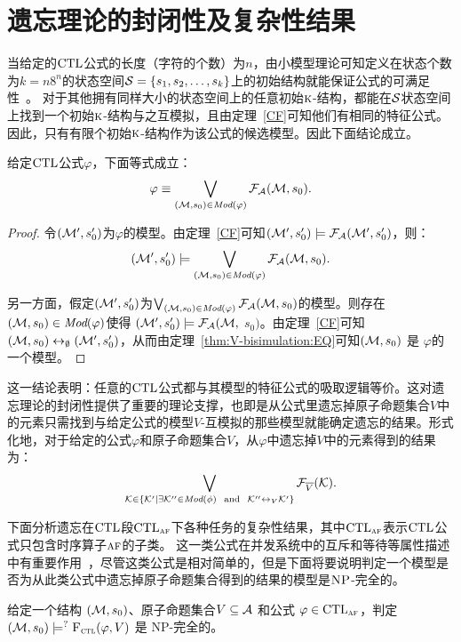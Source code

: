 \section{遗忘理论的封闭性及复杂性结果}\label{chapter06:sec:close}
当给定的$\textrm{CTL}$公式的长度（字符的个数）为$n$，由小模型理论可知定义在状态个数为$k=n8^n$的状态空间${\cal S}=\{s_1,s_2,\dots, s_k\}$上的初始结构就能保证公式的可满足性~\cite{DBLP:journals/jcss/EmersonH85}。
对于其他拥有同样大小的状态空间上的任意初始$\textsc{k}$-结构，都能在${\cal S}$状态空间上找到一个初始$\textsc{k}$-结构与之互模拟，且由定理~\ref{CF}可知他们有相同的特征公式。
因此，只有有限个初始$\textsc{k}$-结构作为该公式的候选模型。因此下面结论成立。

\begin{lemma}\label{lem:models:formula}
	给定$\textrm{CTL}$公式$\varphi$，下面等式成立：
	\begin{equation*}
		\varphi\equiv \bigvee_{({\cal M}, s_0)\in\textit{Mod}(\varphi)}{\cal F}_{\cal A}({\cal M}, s_0).
	\end{equation*}
\end{lemma}
\begin{proof}
	令$({\cal M}', s_0')$为$\varphi$的模型。由定理~\ref{CF}可知$({\cal M}', s_0') \models {\cal F}_{{\cal A}}({\cal M}', s_0')$，则：
	$$({\cal M}', s_0') \models \bigvee_{({\cal M}, s_0)\in \textit{Mod}(\varphi)} {\cal F}_{{\cal A}}({\cal M}, s_0).$$
	
	另一方面，假定$({\cal M}', s_0')$为$\bigvee_{({\cal M}, s_0)\in \textit{Mod}(\varphi)} {\cal F}_{{\cal A}}({\cal M}, s_0)$的模型。则存在$({\cal M}, s_0)\in \textit{Mod}(\varphi)$使得 $({\cal M}', s_0') \models {\cal F}_{{\cal A}}({\cal M},$ $s_0)$。由定理~\ref{CF}可知$({\cal M}, s_0) \leftrightarrow_{\emptyset} ({\cal M}', s_0')$，从而由定理~\ref{thm:V-bisimulation:EQ}可知$({\cal M}, s_0)$ 是 $\varphi$的一个模型。
\end{proof}

这一结论表明：任意的$\textrm{CTL}$公式都与其模型的特征公式的吸取逻辑等价。这对遗忘理论的封闭性提供了重要的理论支撑，也即是从公式里遗忘掉原子命题集合$V$中的元素只需找到与给定公式的模型$V$-互模拟的那些模型就能确定遗忘的结果。形式化地，对于给定的公式$\varphi$和原子命题集合$V$，从$\varphi$中遗忘掉$V$中的元素得到的结果为：
\begin{equation*}
	\bigvee_{{\cal K}\in  \{{\cal K}'\mid \exists {\cal K}''\in\textit{Mod}(\phi)\ \text{ and }\ {\cal K}''\leftrightarrow_V{\cal K}'\}} {\cal F}_{\overline V}({\cal K}).
\end{equation*}


下面分析遗忘在$\textrm{CTL}$段$\textrm{CTL}_{\textsc{a}\textsc{f}}$下各种任务的复杂性结果，其中$\textrm{CTL}_{\textsc{a}\textsc{f}}$表示$\textrm{CTL}$公式只包含时序算子$\textsc{a} \textsc{f}$的子类。
这一类公式在并发系统中的互斥和等待等属性描述中有重要作用~\cite{Baier:PMC:2008}，尽管这类公式是相对简单的，但是下面将要说明判定一个模型是否为从此类公式中遗忘掉原子命题集合得到的结果的模型是$\textsc{NP}$-完全的。
\begin{proposition}[模型检测]
	\label{modelChecking}
	给定一个结构 $({\cal M},s_0)$、原子命题集合$V\subseteq{\cal A}$ 和公式 $\varphi \in \textrm{CTL}_{\textsc{a}\textsc{f}}$，判定 $({\cal M},s_0) \models^? {\textsc{F}_{\textsc{ctl}}}(\varphi, V)$ 是 \textsc{NP}-完全的。
\end{proposition}

